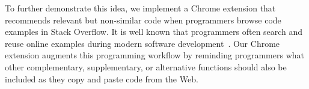 To further demonstrate this idea, we implement a Chrome extension that recommends relevant but non-similar code when programmers browse code examples in Stack Overflow. It is well known that programmers often search and reuse online examples during modern software development~\cite{brandt2010example, umarji2008archetypal, gallardo2009internet}. Our Chrome extension augments this programming workflow by reminding programmers what other complementary, supplementary, or alternative functions should also be included as they copy and paste code from the Web. 



